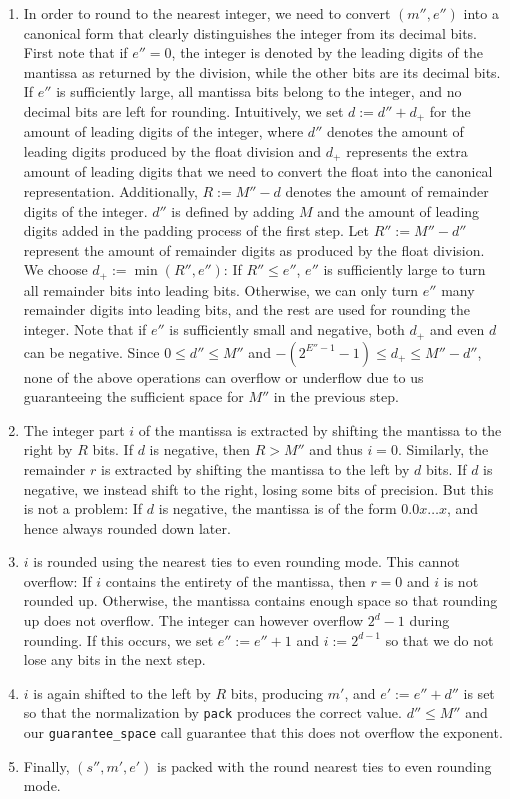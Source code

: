 \documentclass[a4paper,UKenglish,cleveref, autoref, thm-restate]{lipics-v2019}
\begin{document}
\begin{enumerate}
	\item In order to round to the nearest integer, we need to convert $(m'', e'')$ into a canonical form that clearly distinguishes the integer from its decimal bits. First note that if $e'' = 0$, the integer is denoted by the leading digits of the mantissa as returned by the division, while the other bits are its decimal bits. If $e''$ is sufficiently large, all mantissa bits belong to the integer, and no decimal bits are left for rounding. Intuitively, we set $d := d'' + d_+$ for the amount of leading digits of the integer, where $d''$ denotes the amount of leading digits produced by the float division and $d_+$ represents the extra amount of leading digits that we need to convert the float into the canonical representation. Additionally, $R := M'' - d$ denotes the amount of remainder digits of the integer. $d''$ is defined by adding $M$ and the amount of leading digits added in the padding process of the first step. Let $R'' := M'' - d''$ represent the amount of remainder digits as produced by the float division. We choose $d_+ := \min(R'', e'')$: If $R'' \leq e''$, $e''$ is sufficiently large to turn all remainder bits into leading bits. Otherwise, we can only turn $e''$ many remainder digits into leading bits, and the rest are used for rounding the integer. Note that if $e''$ is sufficiently small and negative, both $d_+$ and even $d$ can be negative. Since $0 \leq d'' \leq M''$ and $-(2^{E''-1}-1) \leq d_+ \leq M'' - d''$, none of the above operations can overflow or underflow due to us guaranteeing the sufficient space for $M''$ in the previous step.
	\item The integer part $i$ of the mantissa is extracted by shifting the mantissa to the right by $R$ bits. If $d$ is negative, then $R > M''$ and thus $i = 0$. Similarly, the remainder $r$ is extracted by shifting the mantissa to the left by $d$ bits. If $d$ is negative, we instead shift to the right, losing some bits of precision. But this is not a problem: If $d$ is negative, the mantissa is of the form $0.0x \dots x$, and hence always rounded down later. 
	\item $i$ is rounded using the nearest ties to even rounding mode. This cannot overflow: If $i$ contains the entirety of the mantissa, then $r = 0$ and $i$ is not rounded up. Otherwise, the mantissa contains enough space so that rounding up does not overflow. The integer can however overflow $2^d - 1$ during rounding. If this occurs, we set $e'' := e'' + 1$ and $i := 2^{d-1}$ so that we do not lose any bits in the next step.
	\item $i$ is again shifted to the left by $R$ bits, producing $m'$, and $e' := e'' + d''$ is set so that the normalization by \verb|pack| produces the correct value. $d'' \leq M''$ and our \verb|guarantee_space| call guarantee that this does not overflow the exponent.
	\item Finally, $(s'', m', e')$ is packed with the round nearest ties to even rounding mode.
\end{enumerate}
\end{document}
